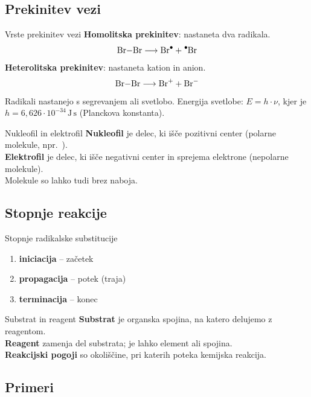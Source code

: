 \documentclass{article}
\begin{document}
\subsection{Prekinitev vezi}

\begin{defbox}{Vrste prekinitev vezi}
\textbf{Homolitska prekinitev}: nastaneta dva radikala.
\[ \ce{Br-Br} \longrightarrow \ce{Br^.} + \ce{^.Br} \]
\textbf{Heterolitska prekinitev}: nastaneta kation in anion.
\[ \ce{Br-Br} \longrightarrow \ce{Br+} + \ce{Br-} \]
Radikali nastanejo s segrevanjem ali svetlobo.
Energija svetlobe: $E = h\cdot\nu$, kjer je $h = 6{,}626\cdot 10^{-34}\,\mathrm{J\,s}$
(Planckova konstanta).
\end{defbox}

\begin{defbox}{Nukleofil in elektrofil}
\textbf{Nukleofil} je delec, ki išče pozitivni center (polarne molekule, npr.\ ). \\
\textbf{Elektrofil} je delec, ki išče negativni center in sprejema elektrone (nepolarne molekule). \\
Molekule so lahko tudi brez naboja.
\end{defbox}

\subsection{Stopnje reakcije}

\begin{rpbox}{Stopnje radikalske substitucije}
\begin{enumerate}[noitemsep]
    \item \textbf{iniciacija} -- začetek
    \item \textbf{propagacija} -- potek (traja)
    \item \textbf{terminacija} -- konec
\end{enumerate}
\end{rpbox}

\begin{defbox}{Substrat in reagent}
\textbf{Substrat} je organska spojina, na katero delujemo z reagentom. \\
\textbf{Reagent} zamenja del substrata; je lahko element ali spojina. \\
\textbf{Reakcijski pogoji} so okoliščine, pri katerih poteka kemijska reakcija.
\end{defbox}

\subsection{Primeri}
\end{document}
